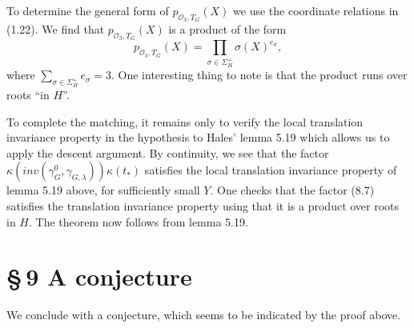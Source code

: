 \documentclass[12pt,letterpaper]{amsart}
\begin{document}
To determine the general form of
$p_{{\mathcal O}_3,T_G}(X)$ we use the coordinate relations in (1.22).
We find that $p_{{\mathcal O}_3,T_G}(X)$ is a product of the form
\[
p_{{\mathcal O}_3,T_G}(X)=\prod_{\sigma \in\Sigma_H^+}\sigma(X)^{e_\sigma},
\tag{8.7}
\]
where $\sum_{\sigma \in\Sigma_H^+}e_\sigma=3$.
One interesting thing to note is that the product runs over roots
``in $H$''.

To complete the matching, it remains only to
verify the local translation invariance property in the hypothesis
to Hales' lemma 5.19 which allows us to apply the
descent argument.
By continuity, we see that the factor
$\kappa(inv(\gamma_G^0,\gamma_{G,\lambda}))\kappa(t_*)$ satisfies the
local translation invariance property of lemma 5.19 above, for
sufficiently small $Y$. One checks that the factor (8.7)
satisfies the translation invariance property using that
it is a product over roots in $H$. The theorem now follows from
lemma 5.19.

\section*{\S\,9  A conjecture}

We conclude with a conjecture, which seems to be indicated by the
proof above.
\end{document}
